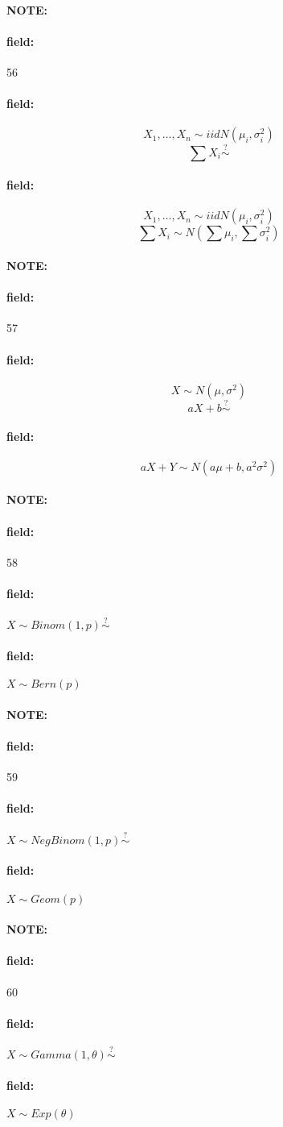 \documentclass[12pt]{article}
\newenvironment{note}{\paragraph{NOTE:}}{}
\newenvironment{field}{\paragraph{field:}}{}
\begin{document}
\begin{note}
  \begin{field}
    \tiny 56
  \end{field}
  \begin{field}
    $$X_1, \ldots, X_n \sim iid N(\mu_i,\sigma_i^2)$$
    $$ \sum X_i \overset{?}{\sim}$$
  \end{field}
  \begin{field}
    $$X_1, \ldots, X_n \sim iid N(\mu_i,\sigma_i^2)$$
    $$ \sum X_i \sim N(\sum \mu_i,\sum \sigma^2_i)$$
  \end{field}
\end{note}

\begin{note}
  \begin{field}
    \tiny 57
  \end{field}
  \begin{field}
    $$X  \sim N(\mu,\sigma^2)$$
    $$ aX + b \overset{?}{\sim}$$
  \end{field}
  \begin{field}
    $$ aX + Y \sim N(a\mu + b, a^2\sigma^2)$$
  \end{field}
\end{note}

\begin{note}
  \begin{field}
    \tiny 58
  \end{field}
  \begin{field}
    $X \sim Binom(1,p) \overset{?}{\sim}$
  \end{field}
  \begin{field}
    $X \sim Bern(p)$
  \end{field}
\end{note}

\begin{note}
  \begin{field}
    \tiny 59
  \end{field}
  \begin{field}
    $X \sim NegBinom(1,p) \overset{?}{\sim}$
  \end{field}
  \begin{field}
    $X \sim Geom(p)$
  \end{field}
\end{note}

\begin{note}
  \begin{field}
    \tiny 60
  \end{field}
  \begin{field}
    $X \sim Gamma(1,\theta) \overset{?}{\sim}$
  \end{field}
  \begin{field}
    $X \sim Exp(\theta)$
  \end{field}
\end{note}
\end{document}
